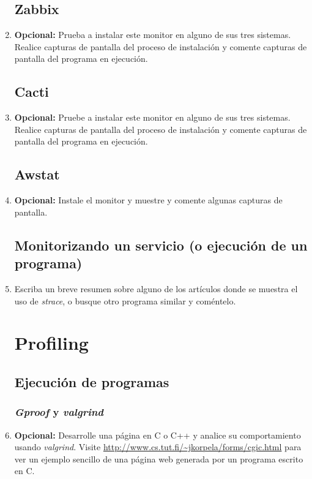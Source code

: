 \documentclass[paper=a4, fontsize=11pt]{scrartcl} %
\numberwithin{equation}{section} %
\numberwithin{figure}{section} %
\numberwithin{table}{section} %
\begin{document}
\begin{enumerate}
	\subsection{Zabbix}
		\item \textbf{Opcional:} Prueba a instalar este monitor en alguno de sus tres sistemas.
		Realice capturas de pantalla del proceso de instalación y comente capturas de pantalla
		del programa en ejecución.
		
	\subsection{Cacti}
		\item \textbf{Opcional:} Pruebe a instalar este monitor en alguno de sus tres sistemas.
		Realice capturas de pantalla del proceso de instalación y comente capturas de pantalla
		del programa en ejecución.
		
	\subsection{Awstat}
		\item \textbf{Opcional:} Instale el monitor y muestre y comente algunas capturas de pantalla.
		
	\subsection{Monitorizando un servicio (o ejecución de un programa)}
		\item Escriba un breve resumen sobre alguno de los artículos donde se muestra el uso de
		\textit{strace}, o busque otro programa similar y coméntelo.
		
	\section{Profiling}
	\subsection{Ejecución de programas}
	\subsubsection{\textit{Gproof} y \textit{valgrind}}
		\item \textbf{Opcional:} Desarrolle una página en C o C++ y analice su comportamiento usando
		\textit{valgrind}. Visite \url{http://www.cs.tut.fi/~jkorpela/forms/cgic.html} para ver un
		ejemplo sencillo de una página web generada por un programa escrito en C.
		

\end{enumerate}
\end{document}
